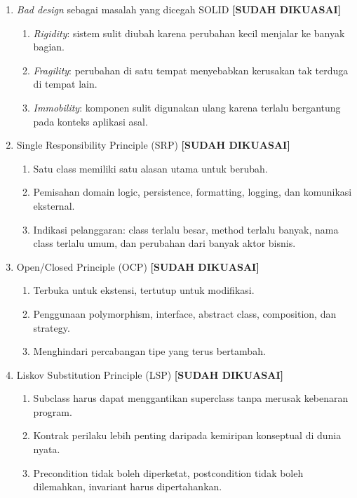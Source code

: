 \begin{enumerate}
    \item \textit{Bad design} sebagai masalah yang dicegah SOLID \textbf{[SUDAH DIKUASAI]}
    \begin{enumerate}
        \item \textit{Rigidity}: sistem sulit diubah karena perubahan kecil menjalar ke banyak bagian.
        \item \textit{Fragility}: perubahan di satu tempat menyebabkan kerusakan tak terduga di tempat lain.
        \item \textit{Immobility}: komponen sulit digunakan ulang karena terlalu bergantung pada konteks aplikasi asal.
    \end{enumerate}
    \item Single Responsibility Principle (SRP) \textbf{[SUDAH DIKUASAI]}
    \begin{enumerate}
        \item Satu class memiliki satu alasan utama untuk berubah.
        \item Pemisahan domain logic, persistence, formatting, logging, dan komunikasi eksternal.
        \item Indikasi pelanggaran: class terlalu besar, method terlalu banyak, nama class terlalu umum, dan perubahan dari banyak aktor bisnis.
    \end{enumerate}
    \item Open/Closed Principle (OCP) \textbf{[SUDAH DIKUASAI]}
    \begin{enumerate}
        \item Terbuka untuk ekstensi, tertutup untuk modifikasi.
        \item Penggunaan polymorphism, interface, abstract class, composition, dan strategy.
        \item Menghindari percabangan tipe yang terus bertambah.
    \end{enumerate}
    \item Liskov Substitution Principle (LSP) \textbf{[SUDAH DIKUASAI]}
    \begin{enumerate}
        \item Subclass harus dapat menggantikan superclass tanpa merusak kebenaran program.
        \item Kontrak perilaku lebih penting daripada kemiripan konseptual di dunia nyata.
        \item Precondition tidak boleh diperketat, postcondition tidak boleh dilemahkan, invariant harus dipertahankan.
    \end{enumerate}

\end{enumerate}
